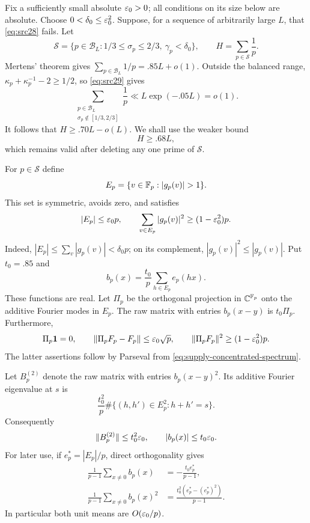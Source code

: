 Fix a sufficiently small absolute \(\varepsilon_0>0\); all conditions on its
size below are absolute. Choose \(0<\delta_0\le\varepsilon_0^2\).
Suppose, for a sequence of arbitrarily large \(L\), that
\eqref{eq:src28} fails. Let
\[
 \mathcal S=\{p\in\mathcal B_L:
                  1/3\le\sigma_p\le2/3,\ \gamma_p<\delta_0\},
 \qquad H=\sum_{p\in\mathcal S}\frac1p.
\]
Mertens' theorem gives \(\sum_{p\in\mathcal B_L}1/p=.85L+o(1)\).
Outside the balanced range,
\(\kappa_p+\kappa_p^{-1}-2\ge1/2\), so \eqref{eq:src29} gives
\[
 \sum_{\substack{p\in\mathcal B_L\\
                   \sigma_p\notin[1/3,2/3]}}\frac1p
 \ll L\exp(-.05L)=o(1).
\]
It follows that \(H\ge .70L-o(L)\). We shall use the weaker bound
\begin{equation}\label{eq:supply-sparse-mass}
 H\ge .68L,
\end{equation}
which remains valid after deleting any one prime of \(\mathcal S\).

For \(p\in\mathcal S\) define
\[
 E_p=\{v\in\F_p:|g_p(v)|>1\}.
\]
This set is symmetric, avoids zero, and satisfies
\begin{equation}\label{eq:supply-concentrated-spectrum}
 |E_p|\le\varepsilon_0p,\qquad
 \sum_{v\in E_p}|g_p(v)|^2\ge(1-\varepsilon_0^2)p.
\end{equation}
Indeed, \(|E_p|\le\sum_v|g_p(v)|<\delta_0p\); on its complement,
\(|g_p(v)|^2\le|g_p(v)|\). Put \(t_0=.85\) and
\[
 b_p(x)=\frac{t_0}{p}\sum_{h\in E_p}e_p(hx).
\]
These functions are real. Let \(\Pi_p\) be the orthogonal projection
in \(\mathbb C^{\mathbb F_p}\) onto the additive Fourier modes in \(E_p\).
The raw matrix with entries \(b_p(x-y)\) is \(t_0\Pi_p\).
Furthermore,
\[
 \Pi_p\mathbf1=0,\qquad
 \|\Pi_pF_p-F_p\|\le\varepsilon_0\sqrt p,
 \qquad
 \|\Pi_pF_p\|^2\ge(1-\varepsilon_0^2)p.
\]
The latter assertions follow by Parseval from
\eqref{eq:supply-concentrated-spectrum}.

Let \(B_p^{(2)}\) denote the raw matrix with entries \(b_p(x-y)^2\).
Its additive Fourier eigenvalue at \(s\) is
\[
 \frac{t_0^2}{p}\#\{(h,h')\in E_p^2:h+h'=s\}.
\]
Consequently
\begin{equation}\label{eq:supply-square-kernel}
 \|B_p^{(2)}\|\le t_0^2\varepsilon_0,\qquad
 |b_p(x)|\le t_0\varepsilon_0.
\end{equation}
For later use, if \(e_p^*=|E_p|/p\), direct orthogonality gives
\begin{align}
 \frac1{p-1}\sum_{x\ne0}b_p(x)
     &=-\frac{t_0e_p^*}{p-1},\nonumber\\
 \frac1{p-1}\sum_{x\ne0}b_p(x)^2
     &=\frac{t_0^2(e_p^*-(e_p^*)^2)}{p-1}.
          \label{eq:supply-unit-moments}
\end{align}
In particular both unit means are \(O(\varepsilon_0/p)\).

